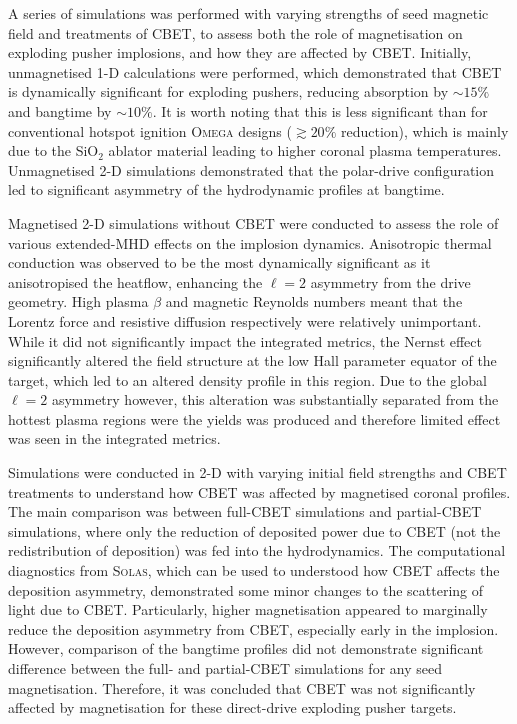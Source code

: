 A series of simulations was performed with varying strengths of seed magnetic field and treatments of \ac{CBET}, to assess both the role of magnetisation on exploding pusher implosions, and how they are affected by \ac{CBET}.
Initially, unmagnetised 1-D calculations were performed, which demonstrated that \ac{CBET} is dynamically significant for exploding pushers, reducing absorption by $\sim15\%$ and bangtime by $\sim10\%$.
It is worth noting that this is less significant than for conventional hotspot ignition \textsc{Omega} designs ($\gtrsim20\%$ reduction), which is mainly due to the SiO$_2$ ablator material leading to higher coronal plasma temperatures.
Unmagnetised 2-D simulations demonstrated that the polar-drive configuration led to significant asymmetry of the hydrodynamic profiles at bangtime.

Magnetised 2-D simulations without \ac{CBET} were conducted to assess the role of various extended-\ac{MHD} effects on the implosion dynamics.
Anisotropic thermal conduction was observed to be the most dynamically significant as it anisotropised the heatflow, enhancing the $\ell=2$ asymmetry from the drive geometry.
High plasma $\beta$ and magnetic Reynolds numbers meant that the Lorentz force and resistive diffusion respectively were relatively unimportant.
While it did not significantly impact the integrated metrics, the Nernst effect significantly altered the field structure at the low Hall parameter equator of the target, which led to an altered density profile in this region.
Due to the global $\ell=2$ asymmetry however, this alteration was substantially separated from the hottest plasma regions were the yields was produced and therefore limited effect was seen in the integrated metrics.

Simulations were conducted in 2-D with varying initial field strengths and \ac{CBET} treatments to understand how \ac{CBET} was affected by magnetised coronal profiles.
The main comparison was between full-\ac{CBET} simulations and partial-\ac{CBET} simulations, where only the reduction of deposited power due to \ac{CBET} (not the redistribution of deposition) was fed into the hydrodynamics.
The computational diagnostics from \textsc{Solas}, which can be used to understood how \ac{CBET} affects the deposition asymmetry, demonstrated some minor changes to the scattering of light due to \ac{CBET}.
Particularly, higher magnetisation appeared to marginally reduce the deposition asymmetry from \ac{CBET}, especially early in the implosion.
However, comparison of the bangtime profiles did not demonstrate significant difference between the full- and partial-\ac{CBET} simulations for any seed magnetisation.
Therefore, it was concluded that \ac{CBET} was not significantly affected by magnetisation for these direct-drive exploding pusher targets.

